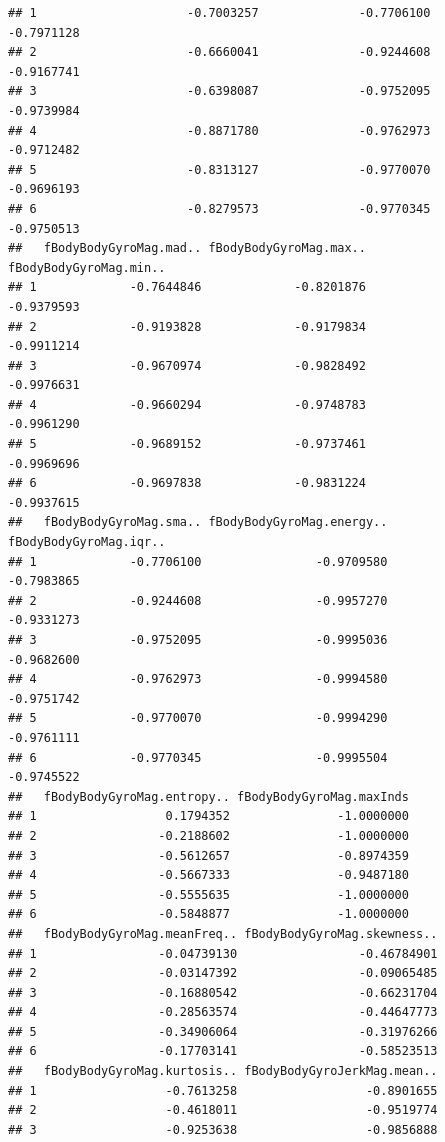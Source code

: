 \documentclass[
]{article}
\begin{document}
\begin{verbatim}
## 1                     -0.7003257              -0.7706100             -0.7971128
## 2                     -0.6660041              -0.9244608             -0.9167741
## 3                     -0.6398087              -0.9752095             -0.9739984
## 4                     -0.8871780              -0.9762973             -0.9712482
## 5                     -0.8313127              -0.9770070             -0.9696193
## 6                     -0.8279573              -0.9770345             -0.9750513
##   fBodyBodyGyroMag.mad.. fBodyBodyGyroMag.max.. fBodyBodyGyroMag.min..
## 1             -0.7644846             -0.8201876             -0.9379593
## 2             -0.9193828             -0.9179834             -0.9911214
## 3             -0.9670974             -0.9828492             -0.9976631
## 4             -0.9660294             -0.9748783             -0.9961290
## 5             -0.9689152             -0.9737461             -0.9969696
## 6             -0.9697838             -0.9831224             -0.9937615
##   fBodyBodyGyroMag.sma.. fBodyBodyGyroMag.energy.. fBodyBodyGyroMag.iqr..
## 1             -0.7706100                -0.9709580             -0.7983865
## 2             -0.9244608                -0.9957270             -0.9331273
## 3             -0.9752095                -0.9995036             -0.9682600
## 4             -0.9762973                -0.9994580             -0.9751742
## 5             -0.9770070                -0.9994290             -0.9761111
## 6             -0.9770345                -0.9995504             -0.9745522
##   fBodyBodyGyroMag.entropy.. fBodyBodyGyroMag.maxInds
## 1                  0.1794352               -1.0000000
## 2                 -0.2188602               -1.0000000
## 3                 -0.5612657               -0.8974359
## 4                 -0.5667333               -0.9487180
## 5                 -0.5555635               -1.0000000
## 6                 -0.5848877               -1.0000000
##   fBodyBodyGyroMag.meanFreq.. fBodyBodyGyroMag.skewness..
## 1                 -0.04739130                 -0.46784901
## 2                 -0.03147392                 -0.09065485
## 3                 -0.16880542                 -0.66231704
## 4                 -0.28563574                 -0.44647773
## 5                 -0.34906064                 -0.31976266
## 6                 -0.17703141                 -0.58523513
##   fBodyBodyGyroMag.kurtosis.. fBodyBodyGyroJerkMag.mean..
## 1                  -0.7613258                  -0.8901655
## 2                  -0.4618011                  -0.9519774
## 3                  -0.9253638                  -0.9856888

\end{verbatim}
\end{document}
